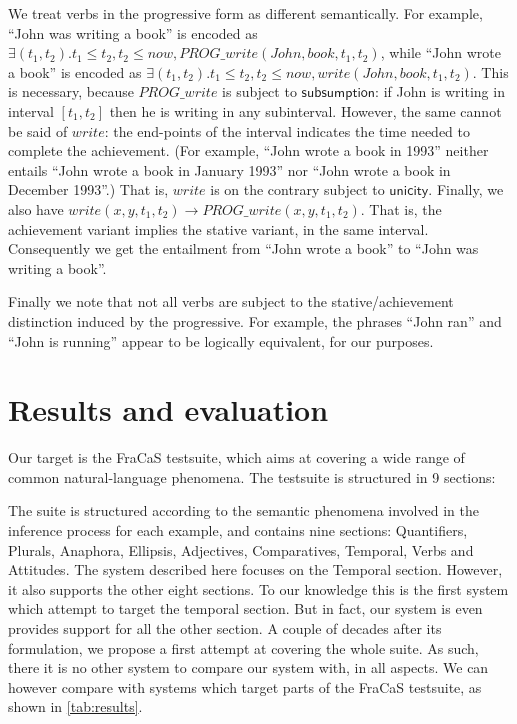 \documentclass[a4paper,11pt]{article}
\newcommand\constant[1]{\mathsf{#1}}
\begin{document}
We treat verbs in the progressive form as different semantically. For
example, ``John was writing a book'' is encoded as
$∃(t_1, t_2). t_1≤ t_2, t_2 ≤ now, PROG\_write(John,book,t_1,t_2)$,
while ``John wrote a book'' is encoded as
$∃(t_1, t_2). t_1≤ t_2, t_2 ≤ now, write(John,book,t_1,t_2)$. This is
necessary, because $PROG\_write$ is subject to
$\constant{subsumption}$: if John is writing in interval $[t_1,t_2]$
then he is writing in any subinterval. However, the same cannot be
said of $write$: the end-points of the interval indicates the time
needed to complete the achievement. (For example, ``John wrote a book
in 1993'' neither entails ``John wrote a book in January 1993'' nor
``John wrote a book in December 1993''.) That is, $write$ is on the
contrary subject to $\constant{unicity}$. Finally, we also have
$write(x,y,t_1,t_2) → PROG\_write(x,y,t_1,t_2)$. That is, the
achievement variant implies the stative variant, in the same interval.
Consequently we get the entailment from ``John wrote a book'' to
``John was writing a book''.

Finally we note that not all verbs are subject to the
stative/achievement distinction induced by the progressive. For
example, the phrases ``John ran'' and ``John is running'' appear to be
logically equivalent, for our purposes.

\section{Results and evaluation}
Our target is the FraCaS testsuite, which aims at covering a wide
range of common natural-language phenomena. The testsuite is structured in 9 sections:


The suite is structured according to the semantic phenomena involved
in the inference process for each example, and contains nine sections:
Quantifiers, Plurals, Anaphora, Ellipsis, Adjectives, Comparatives,
Temporal, Verbs and Attitudes.  The system described here focuses on
the Temporal section. However, it also supports the other eight
sections.  To our knowledge this is the first system which attempt to
target the temporal section. But in fact, our system is even provides
support for all the other section. A couple of decades after its
formulation, we propose a first attempt at covering the whole suite.
As such, there it is no other system to compare our system with, in
all aspects.  We can however compare with systems which target parts
of the FraCaS testsuite, as shown in \cref{tab:results}.
\end{document}
